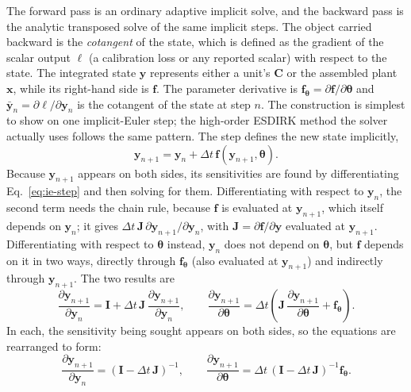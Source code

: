 \documentclass{article}
\begin{document}
The forward pass is an ordinary adaptive implicit solve, and the backward pass is the analytic transposed solve of the same implicit steps. The object carried backward is the \emph{cotangent} of the state, which is defined as the gradient of the scalar output \(\ell\) (a calibration loss or any reported scalar) with respect to the state. The integrated state \(\mathbf{y}\) represents either a unit's \(\mathbf{C}\) or the assembled plant \(\mathbf{x}\), while its right-hand side is \(\mathbf{f}\). The parameter derivative is \(\mathbf{f}_{\boldsymbol{\theta}}=\partial\mathbf{f}/\partial\boldsymbol{\theta}\) and \(\bar{\mathbf{y}}_n=\partial\ell/\partial\mathbf{y}_n\) is the cotangent of the state at step \(n\). The construction is simplest to show on one implicit-Euler step; the high-order ESDIRK method the solver actually uses follows the same pattern. The step defines the new state implicitly,
\begin{equation}
  \mathbf{y}_{n+1}=\mathbf{y}_n+\Delta t\,\mathbf{f}(\mathbf{y}_{n+1},\boldsymbol{\theta}).
  \label{eq:ie-step}
\end{equation}
Because \(\mathbf{y}_{n+1}\) appears on both sides, its sensitivities are found by differentiating Eq.~\eqref{eq:ie-step} and then solving for them. Differentiating with respect to \(\mathbf{y}_n\), the second term needs the chain rule, because \(\mathbf{f}\) is evaluated at \(\mathbf{y}_{n+1}\), which itself depends on \(\mathbf{y}_n\); it gives \(\Delta t\,\mathbf{J}\,\partial\mathbf{y}_{n+1}/\partial\mathbf{y}_n\), with \(\mathbf{J}=\partial\mathbf{f}/\partial\mathbf{y}\) evaluated at \(\mathbf{y}_{n+1}\). Differentiating with respect to \(\boldsymbol{\theta}\) instead, \(\mathbf{y}_n\) does not depend on \(\boldsymbol{\theta}\), but \(\mathbf{f}\) depends on it in two ways, directly through \(\mathbf{f}_{\boldsymbol{\theta}}\) (also evaluated at \(\mathbf{y}_{n+1}\)) and indirectly through \(\mathbf{y}_{n+1}\). The two results are
\begin{equation}
  \frac{\partial\mathbf{y}_{n+1}}{\partial\mathbf{y}_n}=\mathbf{I}+\Delta t\,\mathbf{J}\,\frac{\partial\mathbf{y}_{n+1}}{\partial\mathbf{y}_n},
  \qquad
  \frac{\partial\mathbf{y}_{n+1}}{\partial\boldsymbol{\theta}}=\Delta t\left(\mathbf{J}\,\frac{\partial\mathbf{y}_{n+1}}{\partial\boldsymbol{\theta}}+\mathbf{f}_{\boldsymbol{\theta}}\right).
  \label{eq:step-diff}
\end{equation}
In each, the sensitivity being sought appears on both sides, so the equations are rearranged to form:
\begin{equation}
  \frac{\partial\mathbf{y}_{n+1}}{\partial\mathbf{y}_n}=(\mathbf{I}-\Delta t\,\mathbf{J})^{-1},
  \qquad
  \frac{\partial\mathbf{y}_{n+1}}{\partial\boldsymbol{\theta}}=\Delta t\,(\mathbf{I}-\Delta t\,\mathbf{J})^{-1}\mathbf{f}_{\boldsymbol{\theta}}.
  \label{eq:step-sens}
\end{equation}
\end{document}
